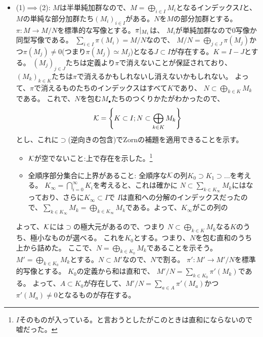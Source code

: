 \documentclass[9pt]{ltjsarticle}
\begin{document}
\begin{myproof}
  \begin{itemize}
    \item (1)$\implies$(2):
      $M$は半単純加群なので、$M=\bigoplus_{i\in I}M_i$となるインデックス$I$と、
      $M$の単純な部分加群たち$(M_i)_{i\in I}$がある。$N$を$M$の部分加群とする。
      $\pi\colon M\to M/N$を標準的な写像とする。$\pi\seigen{M_i}$は、
      $M_i$が単純加群なので0写像か同型写像である。
      $\sum_{i\in I}\pi(M_i) = M/N$なので、
      $M/N = \bigoplus_{j\in J}\pi(M_j)$かつ$\pi(M_j)\neq 0$(つまり$\pi(M_j)\simeq M_j$)となる$J\subset I$が存在する。$K=I-J$とする。
      $(M_j)_{j\in J}$たちは定義より$\pi$で消えないことが保証されており、
      $(M_k)_{k\in K}$たちは$\pi$で消えるかもしれないし消えないかもしれない。
      よって、$\pi$で消えるものたちのインデックスはすべて$K$であり、
      $N \subset \bigoplus_{k\in K}M_k$である。
      これで、$N$を包む$M_\bullet$たちのつくりかたがわかったので、
      \begin{align}
        \cal K = \set{K\subset I; N \subset \bigoplus_{k\in K}M_k}
      \end{align}
      とし、これに$\supset$(逆向きの包含)でZornの補題を適用できることを示す。
      \begin{itemize}
        \item $\cal K$が空でないこと:上で存在を示した。\footnote{$I$そのものが入っている。と言おうとしたがこのときは直和にならないので嘘だった。}
        \item 全順序部分集合に上界があること:
        全順序な$\cal K$の列$K_0 \supset K_1 \supset \dots$を考える。
        $K_\infty = \bigcap_{i=0}^\infty K_i$を考えると、これは確かに
        $N\subset \sum_{k\in K_\infty}M_k$にはなっており、さらに$K_\infty\subset I$で
        $I$は直和への分解のインデックスだったので、$\sum_{k\in K_\infty}M_k = \bigoplus_{k\in K_\infty}M_k$である。よって、$K_\infty$がこの列の
      \end{itemize}
      よって、$\cal K$には$\supset$の極大元があるので、つまり
      $N\subset \bigoplus_{k\in K}M_k$なる$K$のうち、極小なものが選べる。
      これを$K_0$とする。つまり、$N$を包む直和のうち上から詰めた。
      ここで、$N=\bigoplus_{k\in K_0}M_k$であることを示そう。
      $M'= \bigoplus_{k\in K_0}M_k$とする。$N\subset M'$なので、$N$で割る。
      $\pi'\colon M' \to M'/N$を標準的写像とする。
      $K_0$の定義から和は直和で、
      $M'/N = \sum_{k\in K_0}\pi'(M_k)$である。
      よって、$A\subset K_0$が存在して、$M'/N = \sum_{a\in A}\pi'(M_a)$かつ
      $\pi'(M_a)\neq 0$となるものが存在する。

\end{itemize}
\end{myproof}
\end{document}
